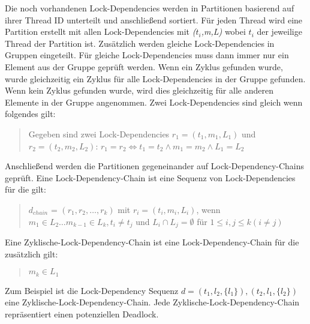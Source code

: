 Die noch vorhandenen Lock-Dependencies werden in Partitionen basierend auf ihrer
Thread ID unterteilt und anschließend sortiert. Für jeden Thread wird eine
Partition erstellt mit allen Lock-Dependencies mit \emph{($t_i$,m,L)} wobei
\emph{$t_i$} der jeweilige Thread der Partition ist. Zusätzlich werden gleiche
Lock-Dependencies in Gruppen eingeteilt. Für gleiche Lock-Dependencies muss dann
immer nur ein Element aus der Gruppe geprüft werden. Wenn ein Zyklus gefunden
wurde, wurde gleichzeitig ein Zyklus für alle Lock-Dependencies in der Gruppe
gefunden. Wenn kein Zyklus gefunden wurde, wird dies gleichzeitig für alle
anderen Elemente in der Gruppe angenommen. Zwei Lock-Dependencies sind gleich
wenn folgendes gilt:
\begin{quote}
  Gegeben sind zwei Lock-Dependencies \emph{$r_1 = (t_1, m_1, L_1)$} und
  \emph{$r_2 = (t_2, m_2, L_2)$}: $r_1 = r_2 \Leftrightarrow t_1 = t_2 \land m_1
  = m_2 \land L_1 = L_2 $
\end{quote}
Anschließend werden die Partitionen gegeneinander auf Lock-Dependency-Chains
geprüft. Eine Lock-Dependency-Chain ist eine Sequenz von Lock-Dependencies für
die gilt:
\begin{quote}
  \textbf{$d_{chain}$} = $(r_1, r_2, \dots , r_k)$ mit $r_i = (t_i, m_i, L_i)$,
  wenn $m_1 \in L_2 \dots m_{k-1} \in L_k, t_i \neq t_j$ und $L_i \cap L_j =
  \emptyset$ für $1 \leq i, j \leq k (i \neq j)$
\end{quote}
Eine Zyklische-Lock-Dependency-Chain ist eine Lock-Dependency-Chain für die
zusätzlich gilt:
\begin{quote}
  $m_k \in L_1$
\end{quote}
Zum Beispiel ist die Lock-Dependency Sequenz \emph{$d = (t_1, l_2, \{l_1\}),
(t_2, l_1, \{l_2\})$} eine Zyklische-Lock-Dependency-Chain. Jede
Zyklische-Lock-Dependency-Chain repräsentiert einen potenziellen Deadlock.